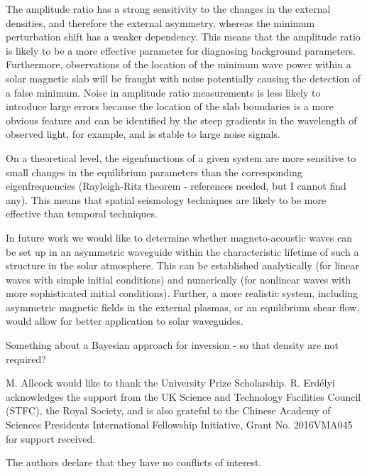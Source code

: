 \documentclass[namedreferences]{solarphysics}
\numberwithin{equation}{section}
\begin{document}
\begin{article}
The amplitude ratio has a strong sensitivity to the changes in the external densities, and therefore the external asymmetry, whereas the minimum perturbation shift has a weaker dependency. This means that the amplitude ratio is likely to be a more effective parameter for diagnosing background parameters. Furthermore, observations of the location of the minimum wave power within a solar magnetic slab will be fraught with noise potentially causing the detection of a false minimum. Noise in amplitude ratio measurements is less likely to introduce large errors because the location of the slab boundaries is a more obvious feature and can be identified by the steep gradients in the wavelength of observed light, for example, and is stable to large noise signals.

On a theoretical level, the eigenfunctions of a given system are more sensitive to small changes in the equilibrium parameters than the corresponding eigenfrequencies (Rayleigh-Ritz theorem - references needed, but I cannot find any). This means that spatial seismology techniques are likely to be more effective than temporal techniques.

In future work we would like to determine whether magneto-acoustic waves can be set up in an asymmetric waveguide within the characteristic lifetime of such a structure in the solar atmosphere. This can be established analytically (for linear waves with simple initial conditions) and numerically (for nonlinear waves with more sophisticated initial conditions). Further, a more realistic system, including asymmetric magnetic fields in the external plasmas, or an equilibrium shear flow, would allow for better application to solar waveguides.



Something about a Bayesian approach for inversion - so that density are not required?

%

%
\begin{acks}
M. Allcock would like to thank the University Prize Scholarship. R. Erd\'{e}lyi acknowledges the support from the UK Science and Technology Facilities Council (STFC), the Royal Society, and is also  grateful to the Chinese Academy of Sciences Presidents International Fellowship Initiative, Grant No. 2016VMA045 for support received. 
\end{acks}

\begin{acks}
The authors declare that they have no conflicts of interest.
\end{acks}





\end{article} 
\end{document}
